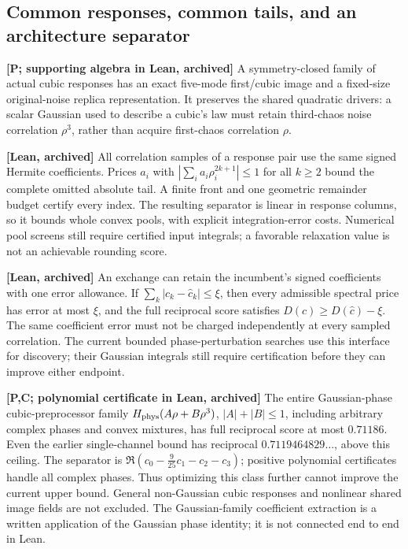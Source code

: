 \documentclass[11pt,a4paper]{article}
\begin{document}
\subsection{Common responses, common tails, and an architecture separator}
\textbf{[P; supporting algebra in Lean, archived]} A symmetry-closed family of actual cubic responses has an exact
five-mode first/cubic image and a fixed-size original-noise replica representation. It preserves the shared
quadratic drivers: a scalar Gaussian used to describe a cubic's law must retain third-chaos noise correlation
$\rho^3$, rather than acquire first-chaos correlation $\rho$.

\textbf{[Lean, archived]} All correlation samples of a response pair use the same signed Hermite coefficients. Prices
$a_i$ with $|\sum_i a_i\rho_i^{2k+1}|\le1$ for all $k\ge2$ bound the complete omitted absolute tail. A finite
front and one geometric remainder budget certify every index. The resulting separator is linear in response
columns, so it bounds whole convex pools, with explicit integration-error costs. Numerical pool screens
still require certified input integrals; a favorable relaxation value is not an achievable rounding score.

\textbf{[Lean, archived]} An exchange can retain the incumbent's signed coefficients with one error allowance.
If $\sum_k|c_k-\widehat c_k|\le\xi$, then every admissible spectral price has error at most $\xi$,
and the full reciprocal score satisfies $D(c)\ge D(\widehat c)-\xi$.
The same coefficient error must not be charged independently at every sampled correlation.
The current bounded phase-perturbation searches use this interface for discovery; their Gaussian
integrals still require certification before they can improve either endpoint.

\textbf{[P,C; polynomial certificate in Lean, archived]} The entire Gaussian-phase cubic-preprocessor family
$H_{\rm phys}(A\rho+B\rho^3)$, $|A|+|B|\le1$, including arbitrary complex phases and convex mixtures,
has full reciprocal score at most $0.71186$. Even the earlier single-channel bound
has reciprocal $0.7119464829\ldots$, above this ceiling.
The separator is $\Re(c_0-\frac9{25}c_1-c_2-c_3)$; positive polynomial certificates handle all complex phases.
Thus optimizing this class further cannot improve the current upper bound. General non-Gaussian cubic
responses and nonlinear shared image fields are not excluded. The Gaussian-family coefficient extraction
is a written application of the Gaussian phase identity; it is not connected end to end in Lean.
\end{document}
